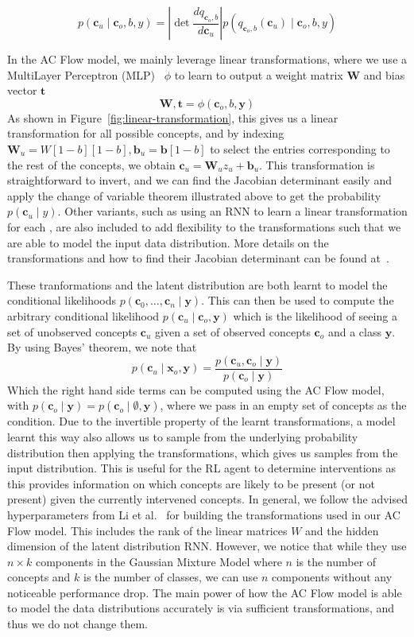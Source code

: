 \documentclass[../main.tex]{subfiles}
\begin{document}
\[p(\mathbf{c}_u \mid \mathbf{c}_o, b, y) = \left | 
\mathop{\mathrm{det}} \frac{d q_{\mathbf{c}_o, b}}{d \mathbf{c}_u}
\right | p(q_{\mathbf{c}_o, b}(\mathbf{c}_u) \mid \mathbf{c}_o, b, y)\]

In the AC Flow model, we mainly leverage
linear transformations, where we use a MultiLayer Perceptron (MLP)~\cite{feedforward} $\phi$ to learn 
to output a weight matrix $\mathbf{W}$ and bias vector $\mathbf{t}$
\[\mathbf{W}, \mathbf{t} = \phi(\mathbf{c}_o, b, \mathbf{y})\]
As shown in Figure~\ref{fig:linear-transformation},
this gives us a linear transformation for all possible concepts,
and by indexing $\mathbf{W}_{u} = W[1-b][1-b], \mathbf{b}_{u} = \mathbf{b}[1-b]$
to select the entries corresponding to the rest of the concepts, we obtain
$\mathbf{c}_u = \mathbf{W}_{u}z_u + \mathbf{b}_{u}$. This transformation is 
straightforward to invert, and we can find the Jacobian determinant easily and apply the change of variable
theorem illustrated above to get the probability $p(\mathbf{c}_u \mid y)$.
Other variants, such as using an RNN to learn a linear transformation
for each , are also included to add flexibility to the transformations such that
we are able to model the input data distribution. More details on the transformations
 and how to find their Jacobian determinant can be found at~\cite{tans}.

These tranformations and the latent distribution are both learnt to
 model the conditional likelihoods $p(\mathbf{c}_0, \ldots, \mathbf{c}_n \mid \mathbf{y})$.
This can then be used to compute the arbitrary conditional likelihood $p(\mathbf{c}_u \mid \mathbf{c}_o, \mathbf{y})$
which is the likelihood of
seeing a set of unobserved concepts $\mathbf{c}_u$
given a set of observed concepts $\mathbf{c}_o$ and a class $\mathbf{y}$. 
By using Bayes' theorem, we note that
\[p(\mathbf{c}_u \mid \mathbf{x}_o, \mathbf{y}) = \frac{p(\mathbf{c}_u, \mathbf{c}_o \mid \mathbf{y})}
{p(\mathbf{c}_o \mid \mathbf{y})}\]
Which the right hand side terms can be computed using the AC Flow model, with
$p(\mathbf{c}_o \mid \mathbf{y}) = p(\mathbf{c}_o \mid \emptyset, \mathbf{y})$, where we 
pass in an empty set of concepts as the condition.
Due to the invertible property of the learnt transformations,
a model learnt this way also allows us to sample from the underlying probability 
distribution then applying the transformations, which gives us 
samples from the input distribution.
This is useful for the RL agent to
determine interventions as
this provides information on which concepts are likely to be present 
(or not present) given the currently intervened
concepts.
In general, we follow the advised hyperparameters from Li et al.~\cite{acflow}
for building the transformations used in our AC Flow model. This includes the rank of the linear
matrices $W$ and the hidden dimension of the latent distribution RNN. However, we notice that while
they use $n \times k$ components in the Gaussian Mixture Model where $n$ is the number of concepts
and $k$ is the number of classes, we can use $n$ components without any noticeable performance drop. 
The main power of how the AC Flow model is able to model the data distributions accurately
is via sufficient transformations, and thus we do not change them.
\end{document}
